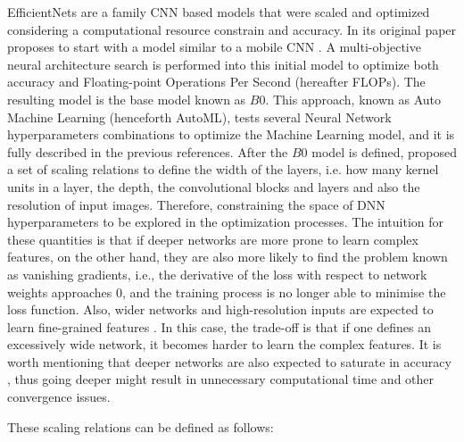 \documentclass[fleqn,usenatbib]{mnras}
\begin{document}
EfficientNets are a family CNN based models that were scaled and optimized considering a computational resource constrain and accuracy. In its original paper \citet{efficientnet} proposes to start with a model similar to a mobile CNN \citep{howard2017mobilenets}. A multi-objective neural architecture
search \citep{tan2019mnasnet} is performed into this initial model to optimize both accuracy and Floating-point Operations Per Second (hereafter FLOPs). The resulting model is the base model known as $B0$.  This approach, known as Auto Machine Learning (henceforth AutoML), tests several Neural Network hyperparameters combinations to optimize the Machine Learning model, and it is fully described in the previous references. 
After the $B0$ model is defined, \citet{efficientnet} proposed a set of scaling relations to define the width of the layers, i.e. how many kernel units in a layer, the depth, the convolutional blocks and layers and also the resolution of input images. Therefore, constraining the space of DNN hyperparameters to be explored in the optimization processes. 
The intuition for these quantities is that if deeper networks are more prone to learn complex features, on the other hand, they are also more likely to find the problem known as vanishing gradients, i.e., the derivative of the loss with respect to network weights approaches $0$, and the training process is no longer able to minimise the loss function. Also, wider networks and high-resolution inputs are expected to learn fine-grained features \citep{zagoruyko2016wide,howard2017mobilenets}. In this case, the trade-off is that if one defines an excessively wide network, it becomes harder to learn the complex features.
It is worth mentioning that deeper networks are also expected to saturate in accuracy \citep{he2016deep}, thus going deeper might result in unnecessary computational time and other convergence issues.

These scaling relations can be defined as follows:
\end{document}
